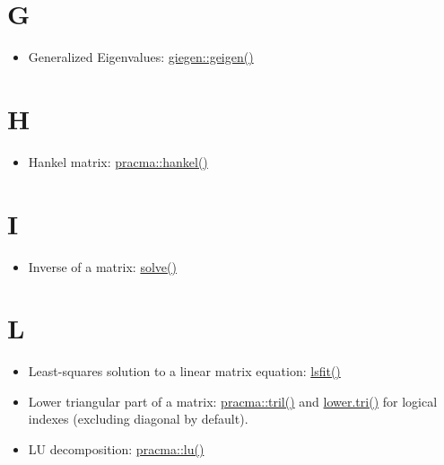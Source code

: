 \documentclass[
]{book}
\providecommand{\tightlist}{%
  \setlength{\itemsep}{0pt}\setlength{\parskip}{0pt}}
\begin{document}
\hypertarget{g}{%
\section*{G}\label{g}}

\begin{itemize}
\tightlist
\item
  Generalized Eigenvalues: \href{https://rdrr.io/cran/geigen/man/geigen.html}{giegen::geigen()}
\end{itemize}

\hypertarget{h}{%
\section*{H}\label{h}}

\begin{itemize}
\tightlist
\item
  Hankel matrix: \href{https://rdrr.io/rforge/pracma/man/hankel.html}{pracma::hankel()}
\end{itemize}

\hypertarget{i}{%
\section*{I}\label{i}}

\begin{itemize}
\tightlist
\item
  Inverse of a matrix: \href{https://stat.ethz.ch/R-manual/R-devel/library/base/html/solve.html}{solve()}
\end{itemize}

\hypertarget{l}{%
\section*{L}\label{l}}

\begin{itemize}
\tightlist
\item
  Least-squares solution to a linear matrix equation: \href{https://stat.ethz.ch/R-manual/R-patched/library/stats/html/lsfit.html}{lsfit()}
\item
  Lower triangular part of a matrix: \href{https://rdrr.io/rforge/pracma/man/tri.html}{pracma::tril()} and \href{https://stat.ethz.ch/R-manual/R-patched/library/base/html/lower.tri.html}{lower.tri()} for logical indexes (excluding diagonal by default).
\item
  LU decomposition: \href{https://rdrr.io/cran/pracma/man/lu.html}{pracma::lu()}
\end{itemize}
\end{document}
